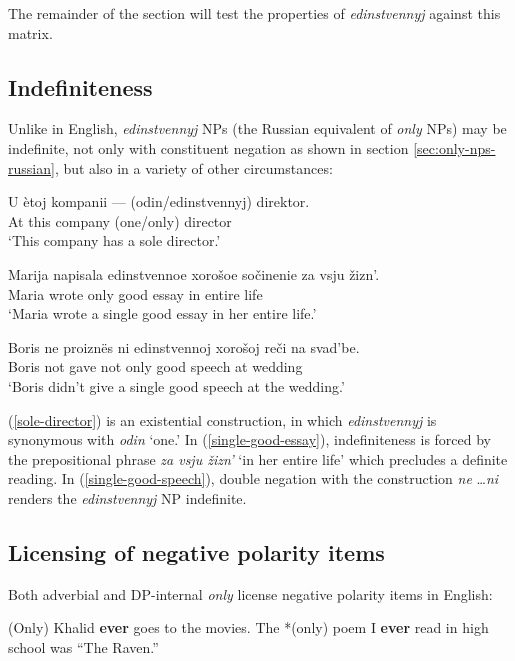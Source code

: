 The remainder of the section will test the properties of \textit{edinstvennyj} against this matrix.

\subsection{Indefiniteness}
Unlike in English, \textit{edinstvennyj} NPs (the Russian equivalent of \textit{only} NPs) may be indefinite, not only with constituent negation as shown in section \ref{sec:only-nps-russian}, but also in a variety of other circumstances: 

\begin{exe}
	\ex \label{sole-director} \gll U \`{e}toj kompanii --- (odin/edinstvennyj) direktor.\\
	At this company {} (one/only) director\\
	\glt `This company has a sole director.'
	
	\ex \label{single-good-essay} \gll Marija napisala edinstvennoe xoro\v{s}oe so\v{c}inenie za vsju \v{z}izn'.\\
	Maria wrote only good essay in entire life\\
	\glt `Maria wrote a single good essay in her entire life.'
	
	\ex \label{single-good-speech} \gll Boris ne proizn\"{e}s ni edinstvennoj xoro\v{s}oj re\v{c}i na svad'be.\\
	Boris not gave not only good speech at wedding\\
	\glt `Boris didn't give a single good speech at the wedding.'
\end{exe}

(\ref{sole-director}) is an existential construction, in which \textit{edinstvennyj} is synonymous with \textit{odin} `one.' In (\ref{single-good-essay}), indefiniteness is forced by the prepositional phrase \textit{za vsju \v{z}izn'} `in her entire life' which precludes a definite reading. In (\ref{single-good-speech}), double negation with the construction \textit{ne} \ldots \textit{ni} renders the \textit{edinstvennyj} NP indefinite.

\subsection{Licensing of negative polarity items}
Both adverbial and DP-internal \textit{only} license negative polarity items in English:

\begin{exe}
	\ex *(Only) Khalid \textbf{ever} goes to the movies.
	\ex The *(only) poem I \textbf{ever} read in high school was ``The Raven.''
\end{exe}

